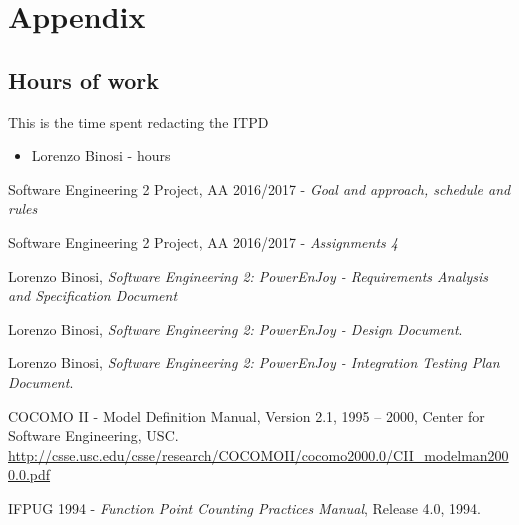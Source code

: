 \appendix \label{sec appendix}

\section{Appendix} 

\subsection{Hours of work}
This is the time spent redacting the ITPD
\begin{itemize}
	\item {Lorenzo Binosi} -   hours
\end{itemize}

\begin{thebibliography}{1}	
	Software Engineering 2 Project, AA 2016/2017 - \emph{Goal and approach, schedule and rules}
	
	Software Engineering 2 Project, AA 2016/2017 - \emph{Assignments 4}
	
	Lorenzo Binosi, \emph{Software Engineering 2: PowerEnJoy - Requirements Analysis and Specification Document}
	
	Lorenzo Binosi, \emph{Software Engineering 2: PowerEnJoy - Design Document}.

	Lorenzo Binosi, \emph{Software Engineering 2: PowerEnJoy - Integration Testing Plan Document}.

	COCOMO II - Model Definition Manual, Version 2.1, 1995 – 2000, Center for Software Engineering, USC. \\
	\url{http://csse.usc.edu/csse/research/COCOMOII/cocomo2000.0/CII_modelman2000.0.pdf}

	IFPUG 1994 - \emph{Function Point Counting Practices Manual}, Release 4.0, 1994.
\end{thebibliography}